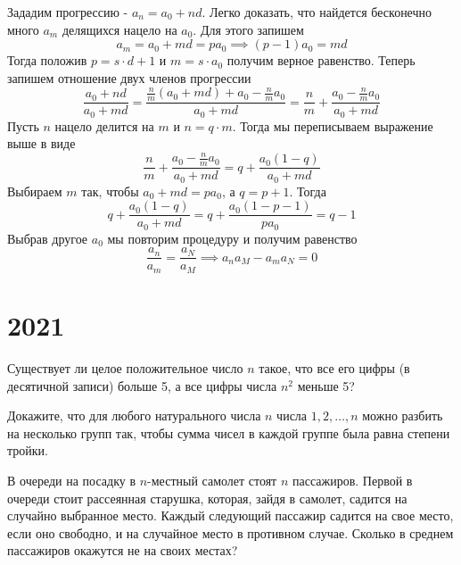 \documentclass[11pt, a4paper]{template}
\begin{document}
\begin{solution}
Зададим прогрессию - $a_{n} = a_{0} + nd$. Легко доказать, что найдется бесконечно много $a_{m}$ делящихся нацело на $a_{0}$. Для этого запишем
$$
a_{m} = a_{0} + md = pa_{0} \implies (p-1)a_{0} = md
$$
Тогда положив $p = s \cdot d+1$ и $m = s \cdot a_{0}$ получим верное равенство. Теперь запишем отношение двух членов прогрессии
$$
\frac{a_{0} + nd}{a_{0} + md} = \frac{\frac{n}{m}(a_{0}+md) + a_{0} - \frac{n}{m}a_{0}}{a_{0} + md} = \frac{n}{m} + \frac{a_{0} - \frac{n}{m}a_{0}}{a_{0} + md}
$$
Пусть $n$ нацело делится на $m$ и $n = q \cdot m$. Тогда мы переписываем выражение выше в виде
$$
\frac{n}{m} + \frac{a_{0} - \frac{n}{m}a_{0}}{a_{0} + md} = q + \frac{a_{0}(1 - q)}{a_{0} + md}
$$
Выбираем $m$ так, чтобы $a_{0} + md = pa_{0}$, а $q = p+1$. Тогда
$$
q + \frac{a_{0}(1 - q)}{a_{0} + md} = q + \frac{a_{0}(1 - p - 1)}{pa_{0}} = q - 1
$$
Выбрав другое $a_{0}$ мы повторим процедуру и получим равенство
$$
\frac{a_{n}}{a_{m}} = \frac{a_{N}}{a_{M}} \implies a_{n}a_{M} - a_{m}a_{N} = 0
$$
\end{solution}

\chapter{2021}

\begin{exercise}[M2638]
Существует ли целое положительное число $n$ такое, что все его цифры (в десятичной записи) больше 5, а все цифры числа $n^{2}$ меньше 5?
\end{exercise}

\begin{exercise}[M2669]
Докажите, что для любого натурального числа $n$ числа $1, 2, \dots, n$ можно разбить на несколько групп так, чтобы сумма чисел в каждой группе была равна степени тройки.
\end{exercise}

\begin{exercise}[M2673]
В очереди на посадку в $n$-местный самолет стоят $n$ пассажиров. Первой в очереди стоит рассеянная старушка, которая, зайдя в самолет, садится на случайно выбранное место. Каждый следующий пассажир садится на свое место, если оно свободно, и на случайное место в противном случае. Сколько в среднем пассажиров окажутся не на своих местах?
\end{exercise}
\end{document}
